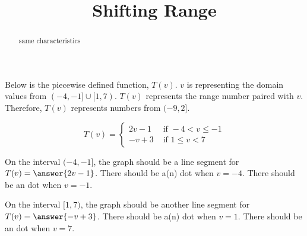 \documentclass{ximera}
\title{Shifting Range}
\begin{document}
\begin{abstract}
same characteristics
\end{abstract}
\maketitle


















Below is the piecewise defined function, $T(v)$.  $v$ is representing the domain values from $(-4,-1] \cup [1,7)$. $T(v)$ represents the range number paired with $v$.   Therefore, $T(v)$ represents numbers from $(-9, 2]$.




\[
T(v) = 
\begin{cases}
  2v-1 & \text{ if }  -4 < v \leq -1 \\
  -v+3 & \text{ if } 1 \leq v < 7
\end{cases}
\]


On the interval $(-4, -1]$, the graph should be a line segment for $T(v) = \answer{2v-1}$.   There should be a(n)  dot when $v = -4$.  There should be an  dot when $v = -1$.









On the interval $[1, 7)$, the graph should be another line segment for $T(v) = \answer{-v+3}$. There should be a(n)  dot when $v = 1$.  There should be an  dot when $v = 7$.
\end{document}
